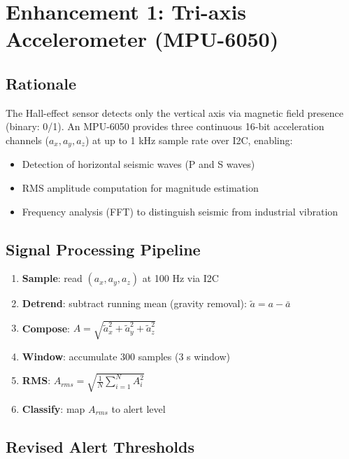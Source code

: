 \documentclass[11pt,a4paper]{article}
\begin{document}
\section{Enhancement 1: Tri-axis Accelerometer (MPU-6050)}

\subsection{Rationale}
The Hall-effect sensor detects only the vertical axis via magnetic field presence (binary: 0/1). An MPU-6050 provides three continuous 16-bit acceleration channels ($a_x, a_y, a_z$) at up to 1 kHz sample rate over I2C, enabling:
\begin{itemize}[noitemsep]
  \item Detection of horizontal seismic waves (P and S waves)
  \item RMS amplitude computation for magnitude estimation
  \item Frequency analysis (FFT) to distinguish seismic from industrial vibration
\end{itemize}

\subsection{Signal Processing Pipeline}

\begin{enumerate}[noitemsep]
  \item \textbf{Sample}: read $(a_x, a_y, a_z)$ at 100 Hz via I2C
  \item \textbf{Detrend}: subtract running mean (gravity removal): $\tilde{a} = a - \bar{a}$
  \item \textbf{Compose}: $A = \sqrt{\tilde{a}_x^2 + \tilde{a}_y^2 + \tilde{a}_z^2}$
  \item \textbf{Window}: accumulate 300 samples (3 s window)
  \item \textbf{RMS}: $A_{rms} = \sqrt{\frac{1}{N}\sum_{i=1}^{N} A_i^2}$
  \item \textbf{Classify}: map $A_{rms}$ to alert level
\end{enumerate}

\subsection{Revised Alert Thresholds}
\end{document}
